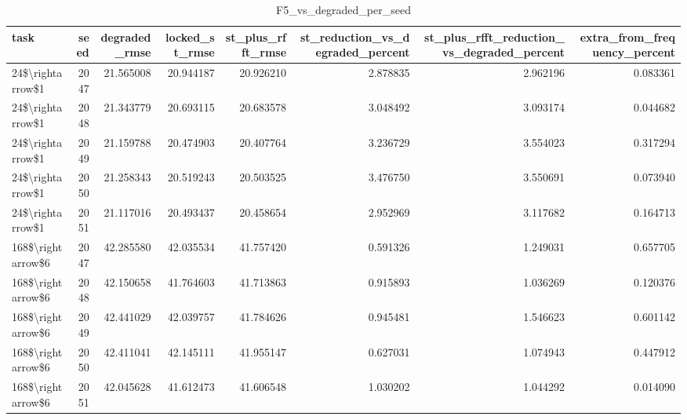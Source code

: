 \begin{table}
\caption{F5_vs_degraded_per_seed}
\label{tab:F5_vs_degraded_per_seed}
\begin{tabular}{lrrrrrrr}
\toprule
task & seed & degraded\_rmse & locked\_st\_rmse & st\_plus\_rfft\_rmse & st\_reduction\_vs\_degraded\_percent & st\_plus\_rfft\_reduction\_vs\_degraded\_percent & extra\_from\_frequency\_percent \\
\midrule
24\$\textbackslash rightarrow\$1 & 2047 & 21.565008 & 20.944187 & 20.926210 & 2.878835 & 2.962196 & 0.083361 \\
24\$\textbackslash rightarrow\$1 & 2048 & 21.343779 & 20.693115 & 20.683578 & 3.048492 & 3.093174 & 0.044682 \\
24\$\textbackslash rightarrow\$1 & 2049 & 21.159788 & 20.474903 & 20.407764 & 3.236729 & 3.554023 & 0.317294 \\
24\$\textbackslash rightarrow\$1 & 2050 & 21.258343 & 20.519243 & 20.503525 & 3.476750 & 3.550691 & 0.073940 \\
24\$\textbackslash rightarrow\$1 & 2051 & 21.117016 & 20.493437 & 20.458654 & 2.952969 & 3.117682 & 0.164713 \\
168\$\textbackslash rightarrow\$6 & 2047 & 42.285580 & 42.035534 & 41.757420 & 0.591326 & 1.249031 & 0.657705 \\
168\$\textbackslash rightarrow\$6 & 2048 & 42.150658 & 41.764603 & 41.713863 & 0.915893 & 1.036269 & 0.120376 \\
168\$\textbackslash rightarrow\$6 & 2049 & 42.441029 & 42.039757 & 41.784626 & 0.945481 & 1.546623 & 0.601142 \\
168\$\textbackslash rightarrow\$6 & 2050 & 42.411041 & 42.145111 & 41.955147 & 0.627031 & 1.074943 & 0.447912 \\
168\$\textbackslash rightarrow\$6 & 2051 & 42.045628 & 41.612473 & 41.606548 & 1.030202 & 1.044292 & 0.014090 \\
\bottomrule
\end{tabular}
\end{table}
